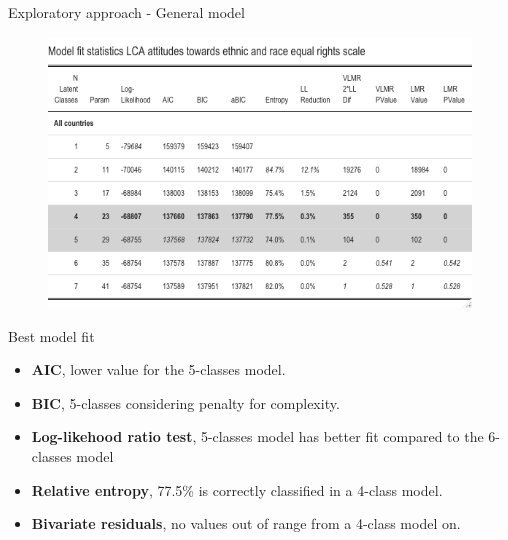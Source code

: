 \documentclass[11pt,t]{beamer}
\begin{document}
\begin{frame}{Exploratory approach - General model}
	\vspace{-2mm} 
\begin{figure}
	\centering
	\includegraphics[height=0.5\textwidth]{graphics/modelfitethnic.png}
\end{figure}
	
\end{frame} 

\begin{frame}{Best model fit}

\begin{itemize}
	\item \textbf{AIC}, lower value for the 5-classes model.
	\vspace{2mm} 
	\item \textbf{BIC}, 5-classes considering penalty for complexity.   
	\vspace{2mm} 
	\item \textbf{Log-likehood ratio test}, 5-classes model has better fit compared to the 6-classes model
	\vspace{2mm} 
	\item \textbf{Relative entropy}, 77.5\% is correctly classified in a 4-class model. 
	\vspace{2mm} 
	\item \textbf{Bivariate residuals}, no values out of range from a 4-class model on.
	\end{itemize}
\end{frame} 
\end{document}
